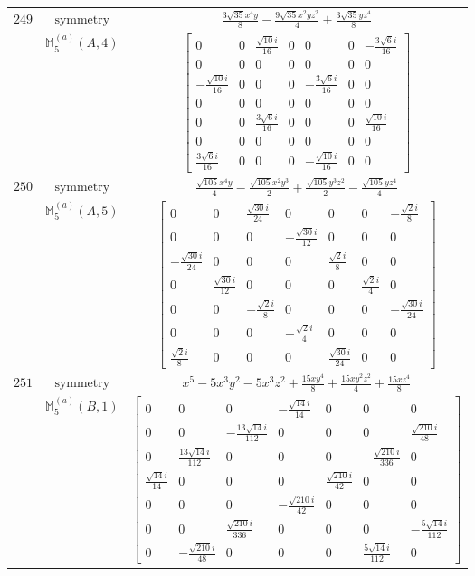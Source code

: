 \documentclass[fleqn,8pt,landscape]{jsarticle}
\begin{document}
\begin{longtable}{ccc}
$ 249 $ & $ \text{symmetry} $ & $ \frac{3 \sqrt{35} x^{4} y}{8} - \frac{9 \sqrt{35} x^{2} y z^{2}}{4} + \frac{3 \sqrt{35} y z^{4}}{8} $ \\
$  $ & $ \mathbb{M}_{5}^{(a)}(A,4) $ & $ \begin{bmatrix} 0 & 0 & \frac{\sqrt{10} i}{16} & 0 & 0 & 0 & - \frac{3 \sqrt{6} i}{16} \\ 0 & 0 & 0 & 0 & 0 & 0 & 0 \\ - \frac{\sqrt{10} i}{16} & 0 & 0 & 0 & - \frac{3 \sqrt{6} i}{16} & 0 & 0 \\ 0 & 0 & 0 & 0 & 0 & 0 & 0 \\ 0 & 0 & \frac{3 \sqrt{6} i}{16} & 0 & 0 & 0 & \frac{\sqrt{10} i}{16} \\ 0 & 0 & 0 & 0 & 0 & 0 & 0 \\ \frac{3 \sqrt{6} i}{16} & 0 & 0 & 0 & - \frac{\sqrt{10} i}{16} & 0 & 0 \end{bmatrix} $ \\ \hline
$ 250 $ & $ \text{symmetry} $ & $ \frac{\sqrt{105} x^{4} y}{4} - \frac{\sqrt{105} x^{2} y^{3}}{2} + \frac{\sqrt{105} y^{3} z^{2}}{2} - \frac{\sqrt{105} y z^{4}}{4} $ \\
$  $ & $ \mathbb{M}_{5}^{(a)}(A,5) $ & $ \begin{bmatrix} 0 & 0 & \frac{\sqrt{30} i}{24} & 0 & 0 & 0 & - \frac{\sqrt{2} i}{8} \\ 0 & 0 & 0 & - \frac{\sqrt{30} i}{12} & 0 & 0 & 0 \\ - \frac{\sqrt{30} i}{24} & 0 & 0 & 0 & \frac{\sqrt{2} i}{8} & 0 & 0 \\ 0 & \frac{\sqrt{30} i}{12} & 0 & 0 & 0 & \frac{\sqrt{2} i}{4} & 0 \\ 0 & 0 & - \frac{\sqrt{2} i}{8} & 0 & 0 & 0 & - \frac{\sqrt{30} i}{24} \\ 0 & 0 & 0 & - \frac{\sqrt{2} i}{4} & 0 & 0 & 0 \\ \frac{\sqrt{2} i}{8} & 0 & 0 & 0 & \frac{\sqrt{30} i}{24} & 0 & 0 \end{bmatrix} $ \\ \hline
$ 251 $ & $ \text{symmetry} $ & $ x^{5} - 5 x^{3} y^{2} - 5 x^{3} z^{2} + \frac{15 x y^{4}}{8} + \frac{15 x y^{2} z^{2}}{4} + \frac{15 x z^{4}}{8} $ \\
$  $ & $ \mathbb{M}_{5}^{(a)}(B,1) $ & $ \begin{bmatrix} 0 & 0 & 0 & - \frac{\sqrt{14} i}{14} & 0 & 0 & 0 \\ 0 & 0 & - \frac{13 \sqrt{14} i}{112} & 0 & 0 & 0 & \frac{\sqrt{210} i}{48} \\ 0 & \frac{13 \sqrt{14} i}{112} & 0 & 0 & 0 & - \frac{\sqrt{210} i}{336} & 0 \\ \frac{\sqrt{14} i}{14} & 0 & 0 & 0 & \frac{\sqrt{210} i}{42} & 0 & 0 \\ 0 & 0 & 0 & - \frac{\sqrt{210} i}{42} & 0 & 0 & 0 \\ 0 & 0 & \frac{\sqrt{210} i}{336} & 0 & 0 & 0 & - \frac{5 \sqrt{14} i}{112} \\ 0 & - \frac{\sqrt{210} i}{48} & 0 & 0 & 0 & \frac{5 \sqrt{14} i}{112} & 0 \end{bmatrix} $ \\ \hline

\end{longtable}
\end{document}
